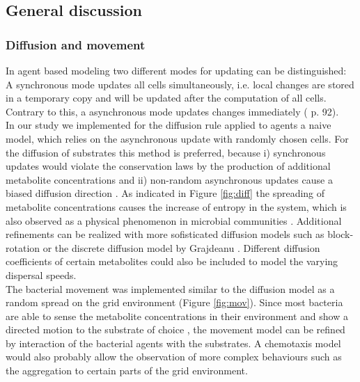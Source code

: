 \subsection{General discussion}

\subsubsection{Diffusion and movement}
In agent based modeling two different modes for updating can be distinguished:
A synchronous mode updates all cells simultaneously, i.e. local changes are stored in a temporary copy and will be updated after the computation of all cells.
Contrary to this, a asynchronous mode updates changes immediately (\cite{Matthies2002} p. 92).\\
In our study we implemented for the diffusion rule applied to agents a naive model, which relies on the asynchronous update with randomly chosen cells.
For the diffusion of substrates this method is preferred, because i) synchronous updates would violate the conservation laws by the production of additional metabolite concentrations and ii) non-random asynchronous updates cause a biased diffusion direction \cite{Bandman1999}.
As indicated in Figure \hyperref[fig:diff]{\ref{fig:diff}} the spreading of metabolite concentrations causes the increase of entropy in the system, which is also observed as a physical phenomenon in microbial communities \cite{Wetzel93}.
Additional refinements can be realized with more sofisticated diffusion models such as block-rotation \cite{Bandman1999} or the discrete diffusion model by Grajdeanu \cite{Grajdeanu2007}.
Different diffusion coefficients of certain metabolites could also be included to model the varying dispersal speeds.\\
The bacterial movement was implemented similar to the diffusion model as a random spread on the grid environment (Figure \hyperref[fig:mov]{\ref{fig:mov}}).
Since most bacteria are able to sense the metabolite concentrations in their environment and show a directed motion to the substrate of choice \cite{Francisco13}, the movement model can be refined by interaction of the bacterial agents with the substrates.
A chemotaxis model would also probably allow the observation of more complex behaviours such as the aggregation to certain parts of the grid environment.

